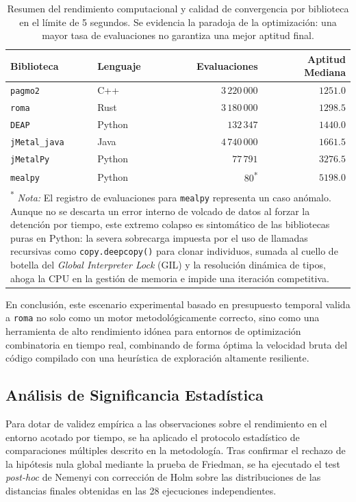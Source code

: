 \documentclass[12pt,a4paper,twoside,openright]{book}
\begin{document}
\begin{table}[ht]
\centering
\caption{Resumen del rendimiento computacional y calidad de convergencia por biblioteca en el límite de 5 segundos. Se evidencia la paradoja de la optimización: una mayor tasa de evaluaciones no garantiza una mejor aptitud final.}
\label{tab:rendimiento_evaluaciones}
    \begin{tabular}{llrr}
        \toprule
        \textbf{Biblioteca} & \textbf{Lenguaje} & \textbf{Evaluaciones} & \textbf{Aptitud Mediana} \\
        \midrule
        \texttt{pagmo2}      & C++    & $3\,220\,000$ & $1251.0$ \\
        \texttt{roma}        & Rust   & $3\,180\,000$ & $1298.5$ \\
        \texttt{DEAP}        & Python & $132\,347$    & $1440.0$ \\
        \texttt{jMetal\_java}& Java   & $4\,740\,000$ & $1661.5$ \\
        \texttt{jMetalPy}    & Python & $77\,791$     & $3276.5$ \\
        \texttt{mealpy}      & Python & $80$\textsuperscript{*} & $5198.0$ \\
        \bottomrule
        \multicolumn{4}{p{0.9\textwidth}}{\footnotesize \textsuperscript{*} \textit{Nota:} El registro de evaluaciones para \texttt{mealpy} representa un caso anómalo. Aunque no se descarta un error interno de volcado de datos al forzar la detención por tiempo, este extremo colapso es sintomático de las bibliotecas puras en Python: la severa sobrecarga impuesta por el uso de llamadas recursivas como \texttt{copy.deepcopy()} para clonar individuos, sumada al cuello de botella del \textit{Global Interpreter Lock} (GIL) y la resolución dinámica de tipos, ahoga la CPU en la gestión de memoria e impide una iteración competitiva.}
    \end{tabular}
\end{table}

    En conclusión, este escenario experimental basado en presupuesto temporal valida a \texttt{roma} no solo como un motor metodológicamente correcto, sino como una herramienta de alto rendimiento idónea para entornos de optimización combinatoria en tiempo real, combinando de forma óptima la velocidad bruta del código compilado con una heurística de exploración altamente resiliente.

\subsection{Análisis de Significancia Estadística}
    Para dotar de validez empírica a las observaciones sobre el rendimiento en el entorno acotado por tiempo, se ha aplicado el protocolo estadístico de comparaciones múltiples descrito en la metodología. Tras confirmar el rechazo de la hipótesis nula global mediante la prueba de Friedman, se ha ejecutado el test \textit{post-hoc} de Nemenyi con corrección de Holm sobre las distribuciones de las distancias finales obtenidas en las 28 ejecuciones independientes. 
\end{document}
